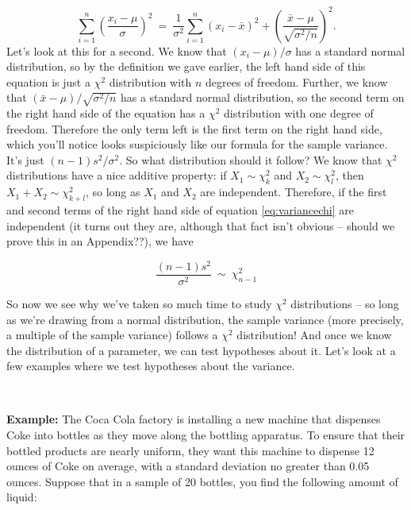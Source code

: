 \begin{equation}\label{eq:variancechi}
\sum_{i=1}^n \left(\frac{x_i - \mu}{\sigma}\right)^2\ =\ \frac{1}{\sigma^2}\sum_{i =1}^n \left(x_i - \bar{x}\right)^2 + \left(\frac{\bar{x}-\mu}{\sqrt{\sigma^2/n}}\right)^2.
\end{equation}
Let's look at this for a second.  We know that $(x_i - \mu)/\sigma$ has a standard normal distribution, so by the definition we gave earlier, the left hand side of this equation is just a $\chi^2$ distribution with $n$ degrees of freedom.  Further, we know that $(\bar{x} - \mu)/\sqrt{\sigma^2/n}$ has a standard normal distribution, so the second term on the right hand side of the equation has a $\chi^2$ distribution with one degree of freedom.  Therefore the only term left is the first term on the right hand side, which you'll notice looks suspiciously like our formula for the sample variance.  It's just $(n-1)s^2/\sigma^2$.  So what distribution should it follow?  We know that $\chi^2$ distributions have a nice additive property: if $X_1 \sim \chi^2_k$ and $X_2 \sim \chi^2_l$, then $X_1 + X_2 \sim \chi^2_{k+l}$, so long as $X_1$ and $X_2$ are independent.  Therefore, if the first and second terms of the right hand side of equation \ref{eq:variancechi} are independent (it turns out they are, although that fact isn't obvious -- should we prove this in an Appendix??), we have 

\begin{equation} \label{eq:sampvardist}
\frac{(n-1)s^2}{\sigma^2} \ \sim \  \chi^2_{n-1}
\end{equation}

So now we see why we've taken so much time to study $\chi^2$ distributions -- so long as we're drawing from a normal distribution, the sample variance (more precisely, a multiple of the sample variance) follows a $\chi^2$ distribution!  And once we know the distribution of a parameter, we can test hypotheses about it.  Let's look at a few examples where we test hypotheses about the variance.

~

\textbf{Example:} The Coca Cola factory \ex is installing a new machine that dispenses Coke into bottles as they move along the bottling apparatus.  To ensure that their bottled products are nearly uniform, they want this machine to dispense 12 ounces of Coke on average, with a standard deviation no greater than 0.05 ounces. Suppose that in a sample of 20 bottles, you find the following amount of liquid:

